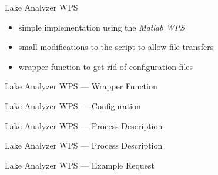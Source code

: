 \documentclass[xcolor=svgnames,professionalfonts,11pt,aspectratio=43,handout]{beamer}
\begin{document}

\begin{frame}[t]{Lake Analyzer WPS}
  \begin{itemize}
    \item simple implementation using the \emph{Matlab WPS}
    \item small modifications to the script to allow file transfers
    \item wrapper function to get rid of configuration files
  \end{itemize}
\end{frame}

\begin{frame}[c,fragile]{Lake Analyzer WPS --- Wrapper Function}
    \begin{center}
      
    \end{center}
\end{frame}

\begin{frame}[c,fragile]{Lake Analyzer WPS --- Configuration}
    \begin{center}
      
    \end{center}
\end{frame}

\begin{frame}[c,fragile]{Lake Analyzer WPS --- Process Description}
    \begin{center}
      
    \end{center}
\end{frame}

\begin{frame}[c,fragile]{Lake Analyzer WPS --- Process Description}
    \begin{center}
      
    \end{center}
\end{frame}

\begin{frame}[c,fragile]{Lake Analyzer WPS --- Example Request}
    \begin{center}
      
    \end{center}
\end{frame}
\end{document}
